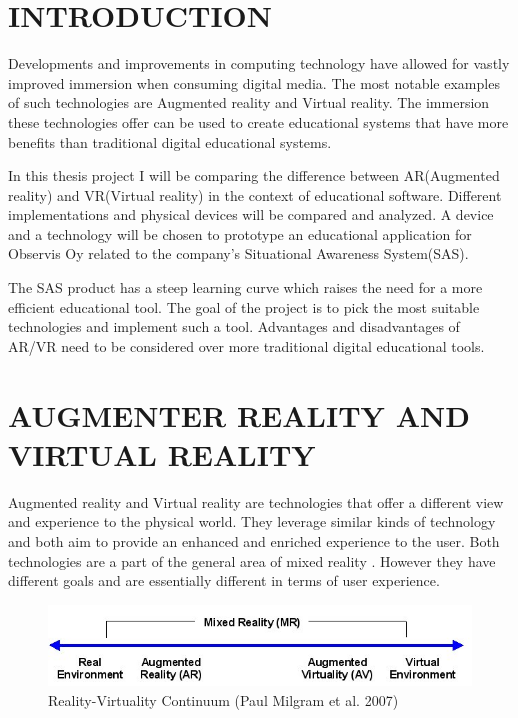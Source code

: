\documentclass[12pt, a4paper,oneside, nocenter]{thesis}
\begin{document}
\chapter{\MakeUppercase{Introduction}}
Developments and improvements in computing technology have allowed for vastly improved immersion when consuming digital media. The most notable examples of such technologies are Augmented reality and Virtual reality. The immersion these technologies offer can be used to create educational systems that have more benefits than traditional digital educational systems. \par
In this thesis project I will be comparing the difference between AR(Augmented reality) and VR(Virtual reality) in the context of educational software. Different implementations and physical devices will be compared and analyzed. A device and a technology will be chosen to prototype an educational application for Observis Oy related to the company’s Situational Awareness System(SAS).\par The SAS product has a steep learning curve which raises the need for a more efficient educational tool. The goal of the project is to pick the most suitable technologies and implement such a tool. Advantages and disadvantages of AR/VR need to be considered over more traditional digital educational tools.
\\
\chapter{\MakeUppercase{Augmenter Reality and Virtual Reality}}
Augmented reality and Virtual reality are technologies that offer a different view and experience to the physical world. They leverage similar kinds of technology and both aim to provide an enhanced and enriched experience to the user. Both technologies are a part of the general area of mixed reality . However they have different goals and are essentially different in terms of user experience.

\begin{figure}[H]
\includegraphics[width=\textwidth]{Virtuality_Continuum_2}
\caption{Reality-Virtuality Continuum (Paul Milgram et al. 2007)}
\label{fig:reality-virtuality}
\end{figure}
\end{document}
